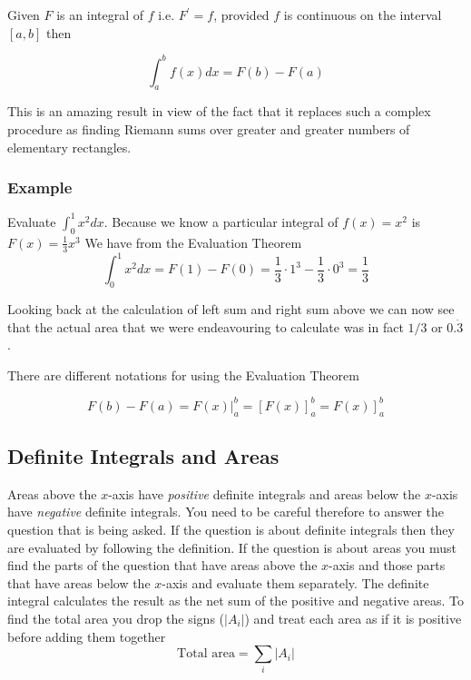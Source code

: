 Given $F$ is an integral of $f$ i.e. $F^{ \prime } =f$, provided $f$ is continuous on the interval $\left [a ,b\right ]$ then 

\begin{equation*}\int _{a}^{b}f (x) d x =F (b) -F (a)
\end{equation*}

This is an amazing result in view of the fact that it replaces such a complex procedure as finding
Riemann sums over greater and greater numbers of elementary rectangles. 

\subsubsection{Example}
Evaluate $\int _{0}^{1}x^{2} d x$. Because we know a particular integral of $f (x) =x^{2}$ is $F (x) =\frac{1}{3} x^{3}$ We have from the Evaluation Theorem
\begin{equation*}\int _{0}^{1}x^{2} d x =F (1) -F (0) =\frac{1}{3} \cdot 1^{3} -\frac{1}{3} \cdot 0^{3} =\frac{1}{3}
\end{equation*}

Looking back at the calculation of left sum and right sum above we can now see that the actual area
that we were endeavouring to calculate was in fact $1/3$ or $0. \dot{3}$. 

There are different notations for using the Evaluation Theorem 

\begin{equation*}F (b) -F (a) =F (x)\vert _{a}^{b} =\left [F (x)\right ]_{a}^{b} =\left .F (x)\right ]_{a}^{b}
\end{equation*}

\subsection{Definite Integrals and Areas}
Areas above the $x$-axis have \emph{positive} definite integrals and areas below the $x$-axis have \emph{negative} definite integrals. You need to be careful
therefore to answer the question that is being asked. If the question is about definite integrals then they
are evaluated by following the definition. If the question is about areas you must find the parts of the question
that have areas above the $x$-axis and those parts that have areas below the $x$-axis and evaluate them separately. The definite integral calculates the result as
the net sum of the positive and negative areas. To find the total area you drop the signs ($\left \vert A_{i}\right \vert $) and treat each area as if it is positive before adding them together
\begin{equation*}\text{Total area} =\sum _{i}\left \vert A_{i}\right \vert 
\end{equation*}

